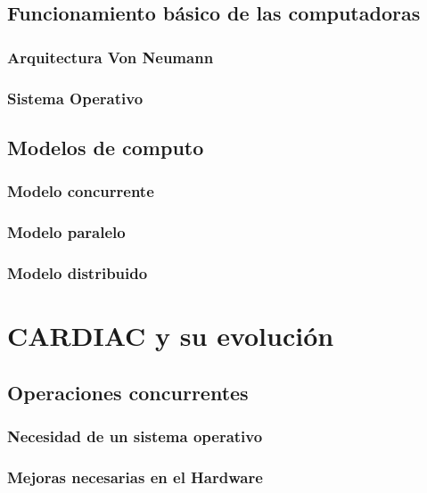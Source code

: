 \documentclass[letterpaper,12pt,oneside]{book}
\begin{document}
	\section{Funcionamiento básico de las computadoras}   %
		
		\subsection{Arquitectura Von Neumann}   
	
		\subsection{Sistema Operativo}   	

	\section{Modelos de computo}

		\subsection{Modelo concurrente}

		\subsection{Modelo paralelo}
	
		\subsection{Modelo distribuido}

\chapter{CARDIAC y su evolución}  %
	\section{Operaciones concurrentes}
	
		\subsection{Necesidad de un sistema operativo}
		
		\subsection{Mejoras necesarias en el Hardware}
		
\end{document}
